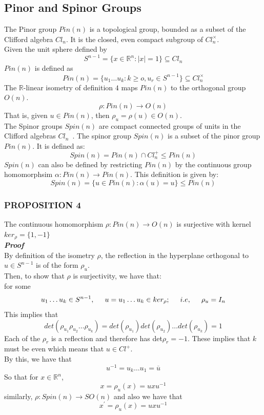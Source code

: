 \documentclass[12pt,onecolumn,letterpaper]{article} %
\begin{document}
 \subsection{Pinor and Spinor Groups}
The Pinor group $Pin(n)$ is a topological group, bounded as a subset of  the Clifford algebra $Cl_n$. It is the closed, even compact subgroup of $Cl_n^{\times}$.\\
Given the unit sphere defined by
$$S^{n-1}=\{x \in \mathbb{R}^n : |x|=1\}\subseteq Cl_n$$
$Pin(n)$ is defined as
\begin{equation}
    Pin(n)=\{u_1 \dots u_k : k\ge o, u_r \in S^{n-1}\}\subseteq Cl_n^{\times}\label{pinor}
\end{equation}
The $\mathbb{R}$-linear isometry of definition $4$ maps $Pin(n)$ to the orthogonal group $O(n)$. 
$$\rho : Pin(n) \to O(n)$$
That is, given $u\in Pin(n)$, then $\rho_u=\rho(u)\in O(n)$.\\
 The Spinor groups $Spin(n)$ are compact connected  groups of units in the Clifford algebras $Cl_n$~\cite{baker2000introduction,baker2012matrix}.
 The spinor group $Spin(n)$ is a subset of the pinor group $Pin(n)$. It is defined as:
 $$Spin(n)=Pin(n)\cap Cl_n^+\le Pin(n)$$
 $Spin(n)$ can also be defined by restricting $Pin(n)$ by the continuous group homomorphsim $\alpha : Pin(n)\to Pin(n)$. This definition is given by:
 $$Spin(n)=\{u\in Pin(n) : \alpha(u)=u\}\le Pin(n)$$
\subsubsection{PROPOSITION 4}\label{prop4}
The continuous homomorphism $\rho : Pin(n) \to O(n)$ is surjective with kernel  $ker_\rho = \{1, -1\}$\\
\textbf{\emph{Proof}}\\
By definition of the isometry $\rho$, the reflection in the hyperplane orthogonal to $u \in S^{n-1}$ is of the form $\rho_u$.\\
Then, to show that $\rho$ is surjectivity, we have that:\\
for some
$$u_1 \dots u_k \in S^{n-1},\hspace{.5cm} u=u_1 \dots u_k\in ker_\rho; \hspace{.5cm} i.e,\hspace{.5cm} \rho_u=I_n$$
This implies that
$$det\left(\rho_{u_1}\rho_{u_2}\dots\rho_{u_k}\right)=det(\rho_{u_1})det(\rho_{u_2})\dots det(\rho_{u_k})=1$$
Each of the $\rho_r$ is a reflection and therefore has det$\rho_r=-1$. These implies that $k$ must be even which means that $u \in Cl^+$.\\
By this, we have that
$$u^{-1}=u_k \dots u_1=\overline{u}$$
So that for $x\in \mathbb{R}^n$,
\begin{equation}
    x=\rho_u(x)=uxu^{-1}\label{rotor1}
\end{equation}
similarly, $\rho : Spin(n) \to SO(n)$ and also we have that
\begin{equation}
    x^'=\rho_u(x)=uxu^{-1}\label{rotor2}
\end{equation}
\end{document}

